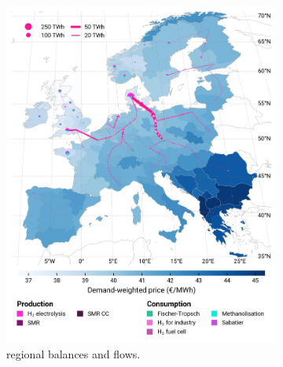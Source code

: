 \documentclass[preprint,12pt,sort&compress]{elsarticle}
\begin{document}
\begin{figure}[htbp]
  \centering
  \begin{subfigure}[t]{0.49\textwidth}
      \vspace{0pt}
      \includegraphics[width=1\textwidth]{maps/pcipmi-national-international-expansion/base_s_adm___2030-balance_map_H2}
      \vspace{-0.5cm}
      \caption{ regional balances and flows.}
      \label{fig:PCI-in_lt_2030_h2}
  \end{subfigure}
  \hfill
  \begin{subfigure}[t]{0.49\textwidth}
      \vspace{0pt}

\end{subfigure}
\end{figure}
\end{document}
